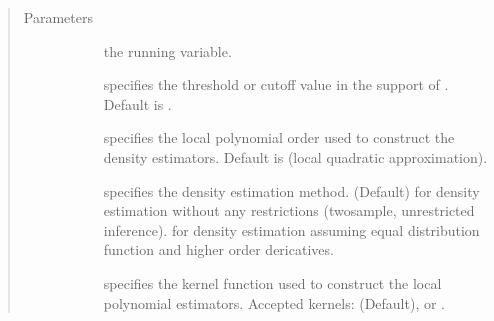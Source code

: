 \documentclass[letterpaper,10pt,english]{sphinxmanual}
\begin{document}
\begin{fulllineitems}
\label{\detokenize{rdbwdensity:rddensity.rdbwdensity.rdbwdensity}}
\pysigstartsignatures
{}
\pysigstopsignatures\begin{quote}\begin{description}
\item[{Parameters}] \leavevmode\begin{description}
\item[{}] \leavevmode
\sphinxAtStartPar
the running variable.

\item[{}] \leavevmode
\sphinxAtStartPar
specifies the threshold or cutoff value in the support of . Default is .

\item[{}] \leavevmode
\sphinxAtStartPar
specifies the local polynomial order used to construct the density estimators. Default is  (local quadratic approximation).

\item[{}] \leavevmode
\sphinxAtStartPar
specifies the density estimation method.  (Default) for density estimation without any restrictions (two\sphinxhyphen{}sample, unrestricted inference).  for density estimation assuming equal distribution function and higher order dericatives.

\item[{}] \leavevmode
\sphinxAtStartPar
specifies the kernel function used to construct the local polynomial estimators. Accepted kernels:  (Default),  or .


\end{description}
\end{description}
\end{quote}
\end{fulllineitems}
\end{document}
